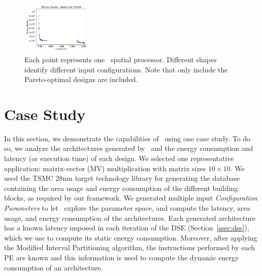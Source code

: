 \begin{figure}[ht]
\centering
  \includegraphics[width=0.3\textwidth]{graphs/EnergyParetoMatrixVec10_v3.pdf}
    \caption{\small Each point represents one \frameworkname~spatial processor. Different shapes identify different input configurations. Note that only include the Pareto-optimal designs are included.}
\label{fig:sram_vs_mram_pareto_vec}
\end{figure}
\section{Case Study}
\label{sec:case_studies}
In this section, we demonstrate the capabilities of \frameworkname~using one case study. To do so, we analyze the architectures generated by \frameworkname~and the energy consumption and latency (or execution time) of each design.
We selected one representative application: matrix-vector (MV) multiplication with matrix sizes $10\times10$. We used the TSMC 28nm target technology library for generating the database containing the area usage and energy consumption of the different building blocks, as required by our framework.
We generated multiple input \textit{Configuration Parameters} to let \frameworkname~explore the parameter space, and compute the latency, area usage, and energy consumption of the architectures. Each generated architecture has a known latency imposed in each iteration of the DSE (Section~\ref{ssec:dse}), which we use to compute its static energy consumption. Moreover, after applying the Modified Interval Partitioning algorithm, the instructions performed by each PE are known and this information is used to compute the dynamic energy consumption of an architecture.

